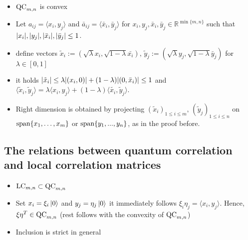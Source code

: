 \begin{frame}
	\begin{itemize}
		\item<1-> $ \textup{QC}_{m,n} $ is convex
		\item<2->Let $a_{ij} = \langle x_i, y_j \rangle $ and $ \bar{a}_{ij} = \langle \bar{x}_i, \bar{y}_j \rangle $ for $ x_{i},y_j, \bar{x}_i,\bar{y}_j \in \mathbb{R}^{\min \{m,n\}} $ such that $ {\left|{x_i}\right|},{\left|{y_j}\right|}, {\left|{\bar{x}_i}\right|}, {\left|{\bar{y}_j}\right|} \le 1 $.
		\item<3-> define vectors $\tilde{x}_i:= (\sqrt{\lambda}x_i,\sqrt{1-\lambda}\bar{x_i}), \, \tilde{y}_j:= (\sqrt{\lambda}y_j, \sqrt{1-\lambda}\bar{y}_j) $ for $ \lambda \in [0,1] $
		\item<4-> it holds $ {\left|{\tilde{x}_i}\right|} \le \lambda {\left|{(x_i,0)}\right|} + (1-\lambda){\left|{(0,\bar{x}_i)}\right|} \le 1 $ and $ \langle \tilde{x}_i, \tilde{y}_j \rangle = \lambda \langle x_i,y_j \rangle + (1-\lambda) \langle \tilde{x_i},\tilde{y}_j \rangle$.
		\item<5-> Right dimension is obtained by projecting $ (\tilde{x}_i)_{1 \le i \le m}, \, (\tilde{y}_j)_{1 \le i \le n} $ on $\textup{span}\{x_1,\hdots,x_m\} $ or $\textup{span}\{y_1,...,y_n\} $, as in the proof before.
	\end{itemize}
\end{frame}
\subsection{The relations between quantum correlation and local correlation matrices}

\begin{frame}
	\begin{itemize}
		\item<1-> $ \textup{LC}_{m,n} \subset \textup{QC}_{m,n} $
		\item<2-> Set $ x_i = \xi_i \ket{0}$ and $ y_j = \eta_j\ket{0} $ it immediately follows  $ \xi_i\eta_j = \langle x_i, y_j \rangle $. Hence, $ \xi\eta^T \in \textup{QC}_{m,n} $ (rest follows with the convexity of $ \textup{QC}_{m,n} $)
		\item<3-> Inclusion is strict in general 
	\end{itemize}
\end{frame}

